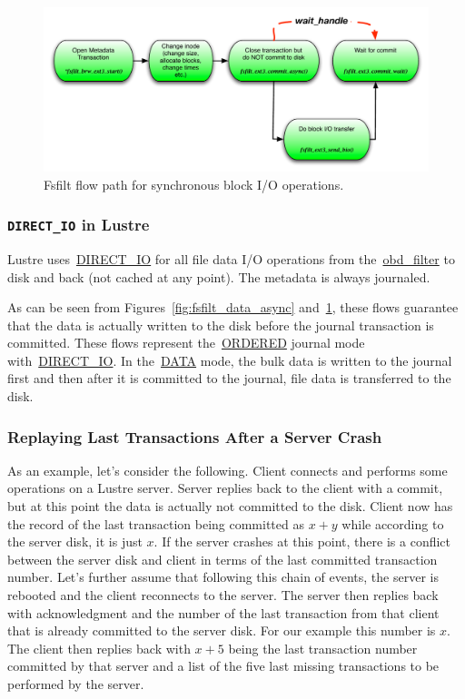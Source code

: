 \begin{figure}[hbt]
\centering
\includegraphics[width=5in]{img/fsfilt_data_sync}
\caption{Fsfilt flow path for synchronous block I/O operations.}
\label{fig:fsfilt_data_sync}
\end{figure}

\subsubsection{\texttt{\small DIRECT\_IO} in Lustre}

Lustre uses~\url{DIRECT_IO} for all file data I/O operations from
the~\url{obd_filter} to disk and back (not cached at any point). The metadata
is always journaled.

As can be seen from Figures~\ref{fig:fsfilt_data_async}
and~\ref{fig:fsfilt_data_sync}, these flows guarantee that the data is actually
written to the disk before the journal transaction is committed. These flows
represent the~\url{ORDERED} journal mode with~\url{DIRECT_IO}. In the~\url{DATA}
mode, the bulk data is written to the journal first and then after it is
committed to the journal, file data is transferred to the disk.

\subsubsection{Replaying Last Transactions After a Server Crash}

As an example, let's consider the following. Client connects and performs some
operations on a Lustre server. Server replies back to the client with a commit,
but at this point the data is actually not committed to the disk.  Client now
has the record of the last transaction being committed as $ x+y $ while 
according to the server disk, it is just $ x $. If the server crashes at this
point, there is a conflict between the server disk and client in terms of the
last committed transaction number. Let's further assume that following this chain of
events, the server is rebooted and the client reconnects to the server. The
server then replies back with acknowledgment and the number of the last
transaction from that client that is already committed to the server disk. For
our example this number is $ x $. The client then replies back with $ x + 5 $
being the last transaction number committed by that server and a list of the five last
missing transactions to be performed by the server.

